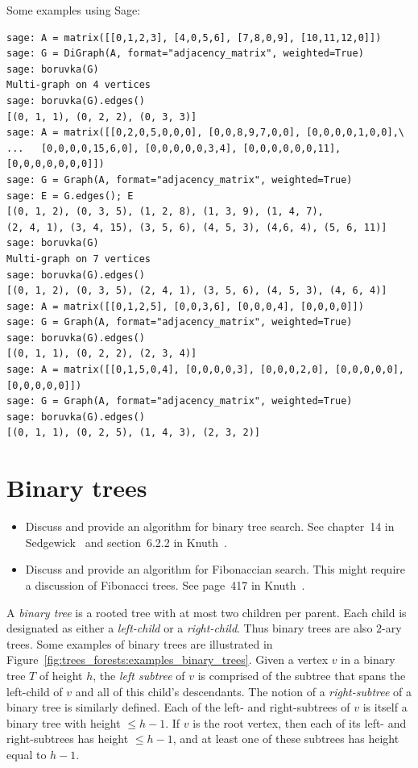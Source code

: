 Some examples using Sage:
%
\begin{lstlisting}
sage: A = matrix([[0,1,2,3], [4,0,5,6], [7,8,0,9], [10,11,12,0]])
sage: G = DiGraph(A, format="adjacency_matrix", weighted=True)
sage: boruvka(G)
Multi-graph on 4 vertices
sage: boruvka(G).edges()
[(0, 1, 1), (0, 2, 2), (0, 3, 3)]
sage: A = matrix([[0,2,0,5,0,0,0], [0,0,8,9,7,0,0], [0,0,0,0,1,0,0],\
...   [0,0,0,0,15,6,0], [0,0,0,0,0,3,4], [0,0,0,0,0,0,11], [0,0,0,0,0,0,0]])
sage: G = Graph(A, format="adjacency_matrix", weighted=True)
sage: E = G.edges(); E
[(0, 1, 2), (0, 3, 5), (1, 2, 8), (1, 3, 9), (1, 4, 7),
(2, 4, 1), (3, 4, 15), (3, 5, 6), (4, 5, 3), (4,6, 4), (5, 6, 11)]
sage: boruvka(G)
Multi-graph on 7 vertices
sage: boruvka(G).edges()
[(0, 1, 2), (0, 3, 5), (2, 4, 1), (3, 5, 6), (4, 5, 3), (4, 6, 4)]
sage: A = matrix([[0,1,2,5], [0,0,3,6], [0,0,0,4], [0,0,0,0]])
sage: G = Graph(A, format="adjacency_matrix", weighted=True)
sage: boruvka(G).edges()
[(0, 1, 1), (0, 2, 2), (2, 3, 4)]
sage: A = matrix([[0,1,5,0,4], [0,0,0,0,3], [0,0,0,2,0], [0,0,0,0,0], [0,0,0,0,0]])
sage: G = Graph(A, format="adjacency_matrix", weighted=True)
sage: boruvka(G).edges()
[(0, 1, 1), (0, 2, 5), (1, 4, 3), (2, 3, 2)]
\end{lstlisting}



\section{Binary trees}

{\color{red}
\begin{itemize}
\item Discuss and provide an algorithm for binary tree search. See
  chapter~14 in Sedgewick~\cite{Sedgewick1990} and section~6.2.2 in
  Knuth~\cite{Knuth1998c}.

\item Discuss and provide an algorithm for Fibonaccian search. This
  might require a discussion of Fibonacci trees. See page~417 in
  Knuth~\cite{Knuth1998c}.
\end{itemize}
}

A \emph{binary tree} is a rooted tree with at most two children per
parent. Each child is designated as either a \emph{left-child} or a
\emph{right-child}. Thus binary trees are also $2$-ary trees. Some
examples of binary trees are illustrated in
Figure~\ref{fig:trees_forests:examples_binary_trees}. Given a vertex
$v$ in a binary tree $T$ of height $h$, the \emph{left subtree} of $v$
is comprised of the subtree that spans the left-child of $v$ and all
of this child's descendants. The notion of a \emph{right-subtree} of a
binary tree is similarly defined. Each of the left- and right-subtrees
of $v$ is itself a binary tree with height $\leq h - 1$. If $v$ is the
root vertex, then each of its left- and right-subtrees has height
$\leq h - 1$, and at least one of these subtrees has height equal to
$h - 1$.

